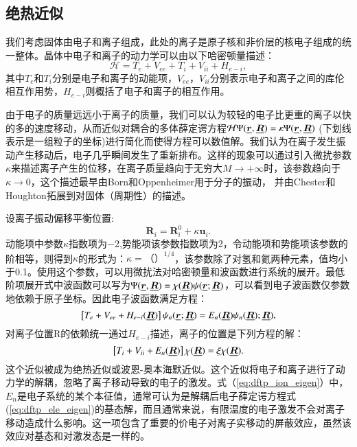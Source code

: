 \subsection{绝热近似}\label{sec:BO-approx}

我们考虑固体由电子和离子组成，此处的离子是原子核和非价层的核电子组成的统一整体。晶体中电子和离子的动力学可以由以下哈密顿量描述：
\begin{equation}
  \mathcal{H} = T_e + V_{ee} + T_i + V_{ii} + H_{e-i},
\end{equation}
其中$T_e$和$T_i$分别是电子和离子的动能项，$ V_{ee}$，$V_{ii}$分别表示电子和离子之间的库伦相互作用势，$H_{e-i}$则概括了电子和离子的相互作用。

由于电子的质量远远小于离子的质量，我们可以认为较轻的电子比更重的离子以快的多的速度移动，从而近似对耦合的多体薛定谔方程$\mathcal{H} \Psi(\underline{\bm{r}},\underline{\bm{R}})=\mathcal{\varepsilon} \Psi(\underline{\bm{r}},\underline{\bm{R}})$ (下划线表示是一组粒子的坐标)进行简化而使得方程可以数值解。我们认为在离子发生振动产生移动后，电子几乎瞬间发生了重新排布。这样的现象可以通过引入微扰参数$\kappa$来描述离子产生的位移，在离子质量趋向于无穷大$M\rightarrow+\infty$时，该参数趋向于$\kappa\rightarrow 0$，这个描述最早由Born和Oppenheimer\cite{oppenheimer1927quantum}用于分子的振动，
并由Chester和Houghton\cite{chester1959electron}拓展到对固体（周期性）的描述。

设离子振动偏移平衡位置:
\begin{equation}
  \bm{R}_i = \bm{R}^0_i + \kappa \bm{u}_i.
\end{equation}
动能项中参数$\kappa$指数项为\num{-2},势能项该参数指数项为\num{2}，令动能项和势能项该参数的阶相等，则得到$\kappa$的形式为：$\kappa=（）^{1/4}$，该参数除了对氢和氦两种元素，值均小于\num{0.1}。使用这个参数，可以用微扰法对哈密顿量和波函数进行系统的展开。最低阶项展开式中波函数可以写为$\Psi(\underline{\bm{r}},\underline{\bm{R}})=\chi(\underline{\bm{R}})\psi(\underline{\bm{r}};\underline{\bm{R}})$，可以看到电子波函数仅参数地依赖于原子坐标。因此电子波函数满足方程：
\begin{equation}\label{eq:dftp_ele_eigen}
  \left[ T_e + V_{ee} + H_{e-i}(\underline{\bm{R}}) \right]\psi_n(\underline{\bm{r}};\underline{\bm{R}}) = E_n(\underline{\bm{R}})\psi_n(\underline{\bm{R}}); \underline{\bm{R}}),
\end{equation}
对离子位置R的依赖统一通过$H_{e-i}$描述，离子的位置是下列方程的解：
\begin{equation}\label{eq:dftp_ion_eigen}
  \left[ T_i + V_{ii} + E_n(\underline{\bm{R}}) \right] \chi(\underline{\bm{R}}) = \xi \chi(\underline{\bm{R}}).
\end{equation}
这个近似被成为绝热近似或波恩-奥本海默近似。这个近似将电子和离子进行了动力学的解耦，忽略了离子移动导致的电子的激发。式（\ref{eq:dftp_ion_eigen}）中，$E_n$是电子系统的某个本征值，通常可认为是解耦后电子薛定谔方程式(\ref{eq:dftp_ele_eigen})的基态解，而且通常来说，有限温度的电子激发不会对离子移动造成什么影响。这一项包含了重要的价电子对离子实移动的屏蔽效应，虽然该效应对基态和对激发态是一样的。

